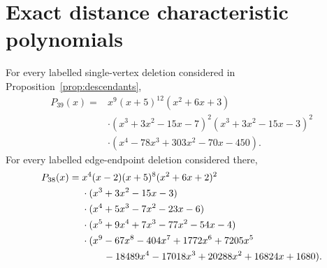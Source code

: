 \documentclass[a4paper,11pt,reqno]{amsart}
\theoremstyle{plain}
\theoremstyle{definition}
\theoremstyle{remark}
\begin{document}
\appendix
\section{Exact distance characteristic polynomials}\label{app:polynomials}

For every labelled single-vertex deletion considered in
Proposition~\ref{prop:descendants},
\begin{align*}
P_{39}(x)={}&x^9(x+5)^{12}(x^2+6x+3)\\
&\cdot(x^3+3x^2-15x-7)^2(x^3+3x^2-15x-3)^2\\
&\cdot(x^4-78x^3+303x^2-70x-450).
\end{align*}
For every labelled edge-endpoint deletion considered there,
\begin{align*}
P_{38}(x)={}&x^4(x-2)(x+5)^8(x^2+6x+2)^2\\
&\cdot(x^3+3x^2-15x-3)\\
&\cdot(x^4+5x^3-7x^2-23x-6)\\
&\cdot(x^5+9x^4+7x^3-77x^2-54x-4)\\
&\cdot(x^9-67x^8-404x^7+1772x^6+7205x^5\\
&\hspace{2.2em}-18489x^4-17018x^3+20288x^2+16824x+1680).
\end{align*}

\begingroup
\footnotesize
\setlength{\bibsep}{0pt}
\renewcommand{\bibsection}{\section*{References}}


\endgroup
\end{document}
